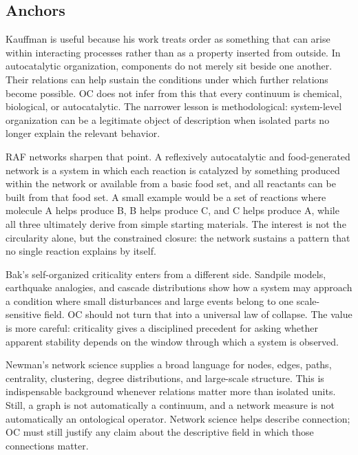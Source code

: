 \documentclass[11pt,a4paper,openany]{book}
\begin{document}
\subsection{Anchors}
Kauffman is useful because his work treats order as something that can arise within interacting processes rather than as a property inserted from outside. In autocatalytic organization, components do not merely sit beside one another. Their relations can help sustain the conditions under which further relations become possible. OC does not infer from this that every continuum is chemical, biological, or autocatalytic. The narrower lesson is methodological: system-level organization can be a legitimate object of description when isolated parts no longer explain the relevant behavior. \cite{kauffman_autocatalytic,raf_networks}\par
RAF networks sharpen that point. A reflexively autocatalytic and food-generated network is a system in which each reaction is catalyzed by something produced within the network or available from a basic food set, and all reactants can be built from that food set. A small example would be a set of reactions where molecule A helps produce B, B helps produce C, and C helps produce A, while all three ultimately derive from simple starting materials. The interest is not the circularity alone, but the constrained closure: the network sustains a pattern that no single reaction explains by itself.\par
Bak's self-organized criticality enters from a different side. Sandpile models, earthquake analogies, and cascade distributions show how a system may approach a condition where small disturbances and large events belong to one scale-sensitive field. OC should not turn that into a universal law of collapse. The value is more careful: criticality gives a disciplined precedent for asking whether apparent stability depends on the window through which a system is observed.\par
Newman's network science supplies a broad language for nodes, edges, paths, centrality, clustering, degree distributions, and large-scale structure. This is indispensable background whenever relations matter more than isolated units. Still, a graph is not automatically a continuum, and a network measure is not automatically an ontological operator. Network science helps describe connection; OC must still justify any claim about the descriptive field in which those connections matter.\par
\end{document}
